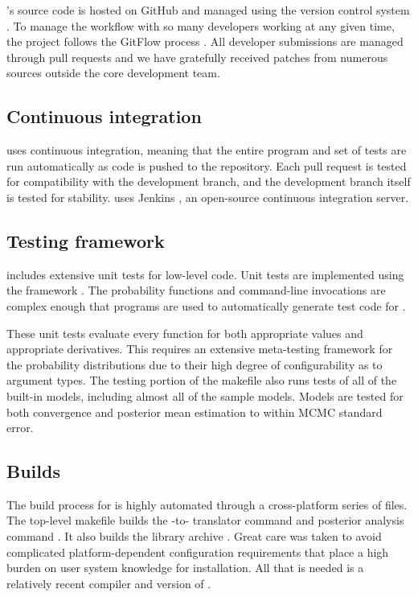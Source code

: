 \documentclass[article]{jss}
\begin{document}
's source code is hosted on GitHub and managed using
the  version control system \citep{Chacon:2009}.  To manage
the workflow with so many developers working at any given time, the
project follows the GitFlow process \citep{Driessen:2010}.  All
developer submissions are managed through pull requests and we have
gratefully received patches from numerous sources outside the core
development team.


\subsection{Continuous integration}

 uses continuous integration, meaning that the entire
program and set of tests are run automatically as code is pushed to
the  repository.  Each pull request is tested for
compatibility with the development branch, and the development branch
itself is tested for stability.   uses Jenkins
\citep{Smart:2011}, an open-source continuous integration server.

\subsection{Testing framework}

 includes extensive unit tests for low-level  code.
Unit tests are implemented using the  framework
\citep{GoogleTest:2011}.  The probability functions and command-line
invocations are complex enough that programs are used to automatically
generate test code for .

These unit tests evaluate every function for both appropriate values
and appropriate derivatives.  This requires an extensive meta-testing
framework for the probability distributions due to their high degree
of configurability as to argument types.  The testing portion of the
makefile also runs tests of all of the built-in models, including
almost all of the  sample models.  Models are tested
for both convergence and posterior mean estimation to within MCMC
standard error.


\subsection{Builds}

The build process for  is highly automated through a
cross-platform series of  files.  The top-level makefile
builds the -to- translator command
 and posterior analysis command .  It
also builds the library archive .  Great care was
taken to avoid complicated platform-dependent configuration
requirements that place a high burden on user system knowledge for
installation.  All that is needed is a relatively recent
 compiler and version of .
\end{document}
